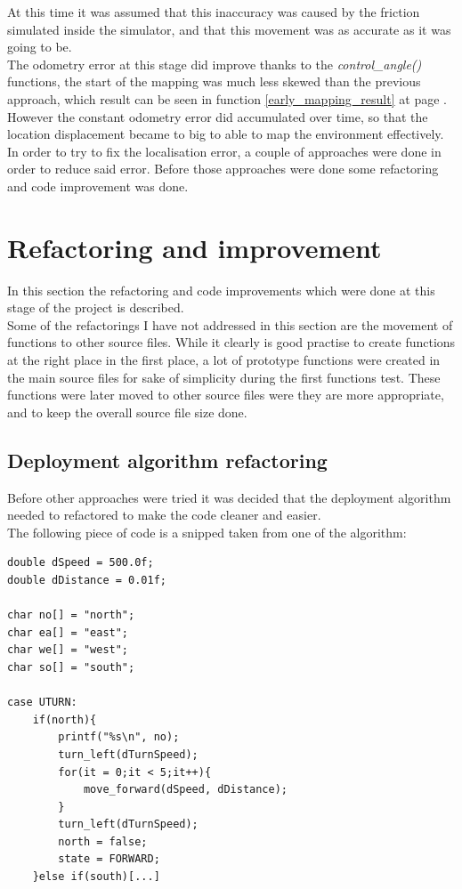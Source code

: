 At this time it was assumed that this inaccuracy was caused by the friction simulated inside the simulator, and that this movement was as accurate as it was going to be. \\
The odometry error at this stage did improve thanks to the \textit{control\_angle()} functions, the start of the mapping was much less skewed than the previous approach, which result can be seen in function \ref{early_mapping_result} at page \pageref{early_mapping_result}. \\[3ex]

However the constant odometry error did accumulated over time, so that the location displacement became to big to able to map the environment effectively. \\
In order to try to fix the localisation error, a couple of approaches were done in order to reduce said error. Before those approaches were done some refactoring and code improvement was done.

\section{Refactoring and improvement}
In this section the refactoring and code improvements which were done at this stage of the project is described. \\
Some of the refactorings I have not addressed in this section are the movement of functions to other source files.
While it clearly is good practise to create functions at the right place in the first place, a lot of prototype functions were created in the main source files for sake of simplicity during the first functions test. These functions were later moved to other source files were they are more appropriate, and to keep the overall source file size done. 

\subsection{Deployment algorithm refactoring}
Before other approaches were tried it was decided that the deployment algorithm needed to refactored to make the code cleaner and easier. \\
The following piece of code is a snipped taken from one of the algorithm:

\begin{lstlisting}[caption={Deployment algorithm refactoring}]
double dSpeed = 500.0f;
double dDistance = 0.01f;

char no[] = "north";
char ea[] = "east";
char we[] = "west";
char so[] = "south";

case UTURN:
	if(north){
		printf("%s\n", no);
		turn_left(dTurnSpeed);
		for(it = 0;it < 5;it++){
			move_forward(dSpeed, dDistance);
		}
		turn_left(dTurnSpeed);
		north = false;
		state = FORWARD;
	}else if(south)[...]
\end{lstlisting}


